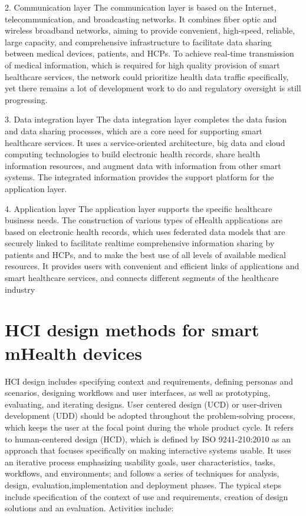 \documentclass[letterpaper,12pt]{article}
\begin{document}
2. Communication layer
The communication layer is based on the Internet, telecommunication, and broadcasting networks. It combines fiber optic and wireless broadband networks, aiming to provide convenient, high-speed, reliable, large capacity, and comprehensive infrastructure to facilitate data sharing between medical devices, patients, and HCPs. To achieve real-time transmission of medical information, which is required for high quality provision of smart healthcare services, the network could prioritize health data traffic specifically, yet there remains a lot of development work to do and regulatory oversight is still progressing.

3. Data integration layer
The data integration layer completes the data fusion and data sharing processes, which are a core need for supporting smart healthcare services. It uses a service-oriented architecture, big data and cloud computing technologies to build electronic health records, share health information resources, and augment data with information from other smart systems. The integrated information provides the support platform for the application layer.

4. Application layer
The application layer supports the specific healthcare business needs. The construction of various types of eHealth applications are based on electronic health records, which uses federated data models that are securely linked to facilitate realtime comprehensive information sharing by patients and HCPs, and to make the best use of all levels of available medical resources. It provides users with convenient and efficient links of applications and smart healthcare services, and connects different segments of the healthcare industry


\section{HCI design methods for smart mHealth devices}

HCI design includes specifying context and requirements, defining personas and scenarios, designing workflows and user interfaces, as well as prototyping, evaluating, and iterating designs. User centered design (UCD) or user-driven development (UDD) should be adopted throughout the problem-solving process, which keeps the user at the focal point during the whole product cycle. It refers to human-centered design (HCD), which is defined by ISO 9241-210:2010 as an approach that focuses specifically on making interactive systems usable. It uses an iterative process emphasizing usability goals, user characteristics, tasks, workflows, and environments; and follows a series of techniques for analysis, design, evaluation,implementation and deployment phases. The typical steps include specification of the context of use and requirements,
creation of design solutions and an evaluation. Activities include:
\end{document}
